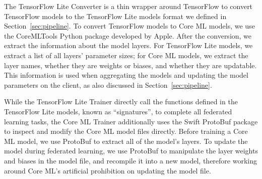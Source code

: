 The TensorFlow Lite Converter is a thin wrapper around TensorFlow to convert
TensorFlow models to the TensorFlow Lite models format we defined in
Section~\ref{sec:pipeline}.
To convert TensorFlow models to Core ML models,
we use the CoreMLTools Python package developed by Apple. After the conversion,
we extract the information about the model layers. For TensorFlow Lite models,
we extract a list of all layers' parameter sizes; for Core ML models,
we extract the layer names, whether they are weights or biases,
and whether they are updatable.
This information is used when aggregating the models and updating the model
parameters on the client, as also discussed in Section~\ref{sec:pipeline}.

While the TensorFlow Lite Trainer directly call the functions defined in the
TensorFlow Lite models, known as ``signatures'',
to complete all federated learning tasks,
the Core ML Trainer additionally uses the Swift ProtoBuf package to inspect and
modify the Core ML model files directly.
Before training a Core ML model,
we use ProtoBuf to extract all of the model's layers.
To update the model during federated learning,
we use ProtoBuf to manipulate the layer weights and biases in the model file,
and recompile it into a new model,
therefore working around Core ML's artificial prohibition on updating the model
file.
